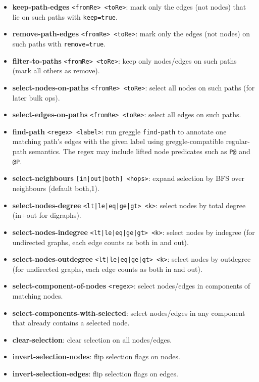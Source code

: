 \documentclass[11pt]{article}
\begin{document}
\begin{itemize}[leftmargin=*]
  \item \textbf{keep-path-edges} \texttt{<fromRe> <toRe>}: mark only
        the edges (not nodes) that lie on such paths with
        \texttt{keep=true}.
  \item \textbf{remove-path-edges} \texttt{<fromRe> <toRe>}: mark only
        the edges (not nodes) on such paths with
        \texttt{remove=true}.
  \item \textbf{filter-to-paths} \texttt{<fromRe> <toRe>}: keep only
        nodes/edges on such paths (mark all others as remove).
  \item \textbf{select-nodes-on-paths} \texttt{<fromRe> <toRe>}:
        select all nodes on such paths (for later bulk ops).
  \item \textbf{select-edges-on-paths} \texttt{<fromRe> <toRe>}:
        select all edges on such paths.
  \item \textbf{find-path} \texttt{<regex> <label>}: run greggle
        \texttt{find-path} to annotate one matching path's edges with
        the given label using greggle-compatible regular-path
        semantics. The regex may include lifted node predicates such
        as \texttt{P@} and \texttt{@P}.
  \item \textbf{select-neighbours} \texttt{[in|out|both] <hops>}:
        expand selection by BFS over neighbours (default both,1).
  \item \textbf{select-nodes-degree} \texttt{<lt|le|eq|ge|gt> <k>}:
        select nodes by total degree (in+out for digraphs).
  \item \textbf{select-nodes-indegree} \texttt{<lt|le|eq|ge|gt> <k>}:
        select nodes by indegree (for undirected graphs, each edge
        counts as both in and out).
  \item \textbf{select-nodes-outdegree} \texttt{<lt|le|eq|ge|gt> <k>}:
        select nodes by outdegree (for undirected graphs, each edge
        counts as both in and out).
  \item \textbf{select-component-of-nodes} \texttt{<regex>}: select
        nodes/edges in components of matching nodes.
  \item \textbf{select-components-with-selected}: select nodes/edges in
        any component that already contains a selected node.
  \item \textbf{clear-selection}: clear selection on all nodes/edges.
  \item \textbf{invert-selection-nodes}: flip selection flags on nodes.
  \item \textbf{invert-selection-edges}: flip selection flags on edges.

\end{itemize}
\end{document}
